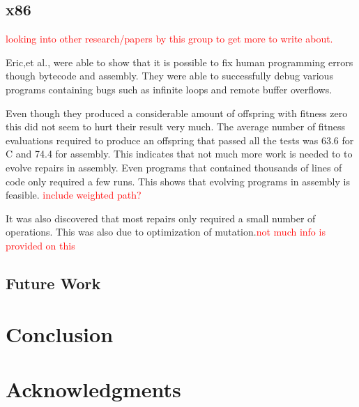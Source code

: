 \documentclass{sig-alternate}
\newcommand{\mycomment}[1]{\textcolor{red}{#1}}
\begin{document}
\subsection{x86}
\mycomment{looking into other research/papers by this group to get more to write about.}

Eric,et al., were able to show that it is possible to fix human programming errors though bytecode and assembly. They were able to successfully debug various programs containing bugs such as infinite loops and remote buffer overflows.

Even though they produced a considerable amount of offspring with fitness zero this did not seem to hurt their result very much. The average number of fitness evaluations required to produce an offspring that passed all the tests was 63.6 for C and 74.4 for assembly. This indicates that not much more work is needed to to evolve repairs in assembly. Even programs that contained thousands of lines of code only required a few runs. This shows that evolving programs in assembly is feasible. \mycomment{include weighted path?}

It was also discovered that most repairs only required a small number of operations. This was also due to optimization of mutation.\mycomment{not much info is provided on this}


\subsection{Future Work}



\section{Conclusion}


\section{Acknowledgments}


%

%
%
\end{document}

